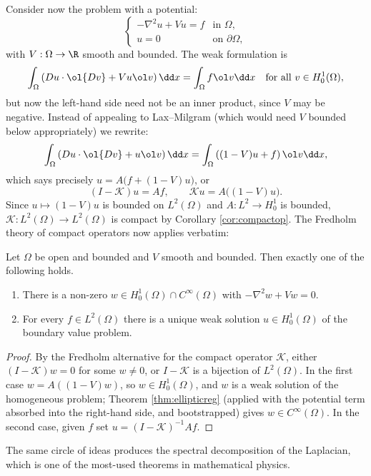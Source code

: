Consider now the problem with a potential:
$$\begin{cases} -\nabla^2u+Vu = f & \text{in }\Omega, \\ u = 0 & \text{on }\partial\Omega,\end{cases}$$
with $V : \Omega \to \R$ smooth and bounded. The weak formulation is
$$\int_\Omega \left( Du\cdot\ol{Dv}+V u\ol v\right)\dd x = \int_\Omega f \ol v \dd x \quad \text{for all } v \in H_0^1(\Omega),$$
but now the left-hand side need not be an inner product, since $V$ may be negative. Instead of appealing to Lax--Milgram (which would need $V$ bounded below appropriately) we rewrite:
$$\int_\Omega\left(Du\cdot\ol{Dv}+u\ol v\right)\dd x = \int_\Omega\left((1-V)u+f\right)\ol v\dd x,$$
which says precisely $u = A\big(f+(1-V)u\big)$, or
$$(I - \mathcal{K})u = Af, \qquad \mathcal{K}u = A\big((1-V)u\big).$$
Since $u \mapsto (1-V)u$ is bounded on $L^2(\Omega)$ and $A : L^2 \to H_0^1$ is bounded, $\mathcal{K} : L^2(\Omega)\to L^2(\Omega)$ is compact by Corollary \ref{cor:compactop}. The Fredholm theory of compact operators now applies verbatim:

\begin{theorem}\label{thm:fredholm}
	Let $\Omega$ be open and bounded and $V$ smooth and bounded. Then exactly one of the following holds.
	\begin{enumerate}[label=(\roman*)]
		\item There is a non-zero $w \in H_0^1(\Omega)\cap C^\infty(\Omega)$ with $-\nabla^2w+Vw=0$.
		\item For every $f \in L^2(\Omega)$ there is a unique weak solution $u \in H_0^1(\Omega)$ of the boundary value problem.
	\end{enumerate}
\end{theorem}

\begin{proof}
	By the Fredholm alternative for the compact operator $\mathcal{K}$, either $(I-\mathcal{K})w=0$ for some $w \ne 0$, or $I - \mathcal{K}$ is a bijection of $L^2(\Omega)$. In the first case $w = A((1-V)w)$, so $w \in H_0^1(\Omega)$, and $w$ is a weak solution of the homogeneous problem; Theorem \ref{thm:ellipticreg} (applied with the potential term absorbed into the right-hand side, and bootstrapped) gives $w \in C^\infty(\Omega)$. In the second case, given $f$ set $u = (I-\mathcal{K})^{-1}Af$.
\end{proof}

The same circle of ideas produces the spectral decomposition of the Laplacian, which is one of the most-used theorems in mathematical physics.

